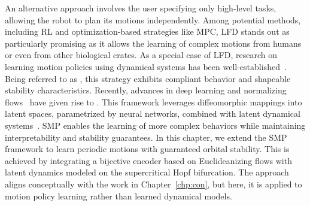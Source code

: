 \begin{foreword}
    An alternative approach involves the user specifying only high-level tasks, allowing the robot to plan its motions independently. Among potential methods, including \gls{RL} and optimization-based strategies like \gls{MPC}, \gls{LFD} stands out as particularly promising as it allows the learning of complex motions from humans or even from other biological crates. As a special case of \gls{LFD}, research on learning motion policies using dynamical systems has been well-established~\citep {ijspeert2013dynamical}. Being referred to as , this strategy exhibits compliant behavior and shapeable stability characteristics. Recently, advances in deep learning and normalizing flows~\citep{kobyzev2020normalizing} have given rise to . This framework leverages diffeomorphic mappings into latent spaces, parametrized by neural networks, combined with latent dynamical systems~\citep{rana2020euclideanizing, perez2023stable, zhi2024teaching}. \gls{SMP} enables the learning of more complex behaviors while maintaining interpretability and stability guarantees.
    In this chapter, we extend the \gls{SMP} framework to learn periodic motions with guaranteed orbital stability. This is achieved by integrating a bijective encoder based on Euclideanizing flows with latent dynamics modeled on the supercritical Hopf bifurcation. The approach aligns conceptually with the work in Chapter~\ref{chp:con}, but here, it is applied to motion policy learning rather than learned dynamical models.
\end{foreword}


\pagebreak

